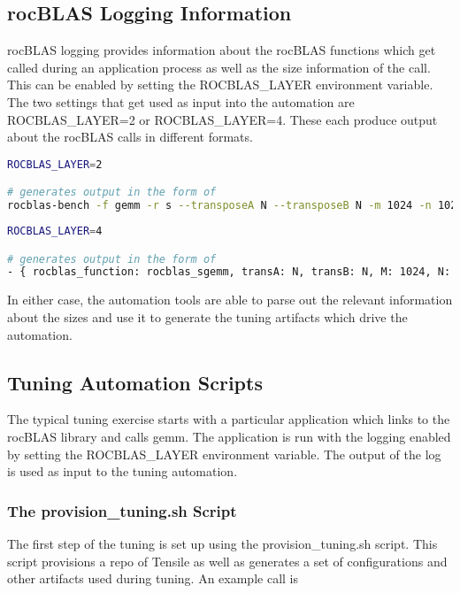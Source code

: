 \documentclass[]{article}
\begin{document}
\subsection{rocBLAS Logging Information}

rocBLAS logging provides information about the rocBLAS functions which get called during an application process as well as the size information of the call. This can be enabled by setting the ROCBLAS\_LAYER environment variable. The two settings that get used as input into the automation are ROCBLAS\_LAYER=2 or ROCBLAS\_LAYER=4. These each produce output about the rocBLAS calls in different formats.

\begin{lstlisting}[language=bash,breaklines=true]
ROCBLAS_LAYER=2

# generates output in the form of
rocblas-bench -f gemm -r s --transposeA N --transposeB N -m 1024 -n 1024 -k 1024 --beta 0.0 --alpha 1.0 --lda 1024 --ldb 1024 --ldc 1024
\end{lstlisting}

\begin{lstlisting}[language=bash,breaklines=true]
ROCBLAS_LAYER=4

# generates output in the form of
- { rocblas_function: rocblas_sgemm, transA: N, transB: N, M: 1024, N: 1024, K: 1024, lda: 1024, ldb: 1024, ldc: 1024}
\end{lstlisting}

\noindent
In either case, the automation tools are able to parse out the relevant information about the sizes and use it to generate the tuning artifacts which drive the automation.

\subsection{Tuning Automation Scripts}

The typical tuning exercise starts with a particular application which links to the rocBLAS library and calls gemm. The application is run with the logging enabled by setting the ROCBLAS\_LAYER environment variable. The output of the log is used as input to the tuning automation.

\subsubsection{The provision\_tuning.sh Script}

The first step of the tuning is set up using the provision\_tuning.sh script. This script provisions a repo of Tensile as well as generates a set of configurations and other artifacts used during tuning. An example call is
\end{document}
